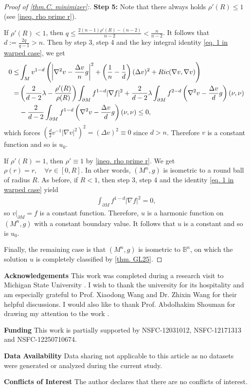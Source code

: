 \documentclass[12pt]{amsart}%
\numberwithin{equation}{section}
\numberwithin{lemma}{section}
\numberwithin{proposition}{section}
\numberwithin{corollary}{section}
\numberwithin{remark}{section}
\begin{document}
\begin{proof}[Proof of \cref{thm.C. minimizer}:]
        \textbf{Step 5:} Note that there always holds $\rho'(R)\leq 1$ (see \cref{ineq. rho prime r}).
        
        If $\rho'(R)<1$, then $q\leq \frac{2(n-1)\rho'(R)-(n-2)}{n-2}<\frac{n}{n-2}$. It follows that $d:=\frac{2q}{q-1}>n$. 
        Then by step 3, step 4 and the key integral identity \cref{eq. 1 in warped case}, we get
        \begin{align*}
            0\leq &\int_{M}v^{1-d}\left(
        \left|\nabla^2 v-\frac{\Delta v}{n}g\right|^2
        +\left(\frac{1}{n}-\frac{1}{d}\right)(\Delta v)^2
        +Ric(\nabla v,\nabla v)
        \right)\notag\\
        =&\left(\frac{2}{d-2}\lambda
        -\frac{\rho'(R)}{\rho(R)}\right)
        \int_{\partial M}f^{1-d}|\nabla f|^2
        +\frac{2}{d-2}\lambda
        \int_{\partial M}f^{2-d}
        \left(\nabla^2 v-\frac{\Delta v}{d}g\right)(\nu,\nu)\notag\\
        &-\frac{2}{d-2}
        \int_{\partial M}f^{1-d}
        \left(\nabla^2 v-\frac{\Delta v}{d}g\right)(\nu,\nu)
        \leq 0,
        \end{align*}
        which forces $(\frac{d}{2}v^{-1}|\nabla v|^2)^2=(\Delta v)^2\equiv 0$ since $d>n$. Therefore $v$ is a constant function and so is $u_0$.

        If $\rho'(R)=1$, then $\rho'\equiv 1$ by \cref{ineq. rho prime r}. We get
            $\rho(r)=r,\quad \forall r\in[0,R]$.
        In other words, $(M^n,g)$ is isometric to a round ball of radius $R$. As before, if $R<1$, then step 3, step 4 and the identity \cref{eq. 1 in warped case} yield 
        \begin{align*}
            \int_{\partial M}f^{1-d}|\nabla f|^2=0,
        \end{align*}
        so $v|_{\partial M}=f$ is a constant function. Therefore, $u$ is a harmonic function on $(M^n,g)$ with a constant boundary value. It follows that $u$ is a constant and so is $u_0$.

        Finally, the remaining case is that $(M^n,g)$ is isometric to $\mathbb{B}^n$, on which the solution $u$ is completely classified by \cref{thm. GL25}.
\end{proof}
\textbf{Acknowledgements} This work was completed during a research visit to Michigan State University
. I wish to thank the university for its hospitality and am especially grateful to Prof. Xiaodong Wang and Dr. Zhixin Wang for their helpful discussions. I would also like to thank Prof. Abdolhakim Shouman for drawing my attention to the work \cite{Sho26}.

\textbf{Funding} This work is partially supported by NSFC-12031012, NSFC-12171313 and NSFC-12250710674.

 \textbf{Data Availability} Data sharing not applicable to this article as no datasets were generated or analyzed during
 the current study.
 
 \textbf{Conflicts of Interest}  The author declares that there are no conflicts of interest.

\end{document}
